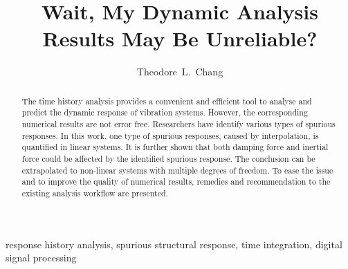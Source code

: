 \documentclass[3p,sort&compress,11pt,fleqn,review]{elsarticle}
\begin{document}
\begin{abstract}
The time history analysis provides a convenient and efficient tool to analyse and predict the dynamic response of vibration systems. However, the corresponding numerical results are not error free. Researchers have identify various types of spurious responses. In this work, one type of spurious responses, caused by interpolation, is quantified in linear systems. It is further shown that both damping force and inertial force could be affected by the identified spurious response. The conclusion can be extrapolated to non-linear systems with multiple degrees of freedom. To ease the issue and to improve the quality of numerical results, remedies and recommendation to the existing analysis workflow are presented.
\end{abstract}
\begin{keyword}
response history analysis\sep
spurious structural response\sep
time integration\sep
digital signal processing
\end{keyword}
\begin{frontmatter}
\title{Wait, My Dynamic Analysis Results May Be Unreliable?}
\author[add1]{Theodore~L.~Chang}
\address[add1]{IRIS Adlershof, Humboldt-Universität zu Berlin, Berlin, Germany, 12489.}
\end{frontmatter}




\end{document}

